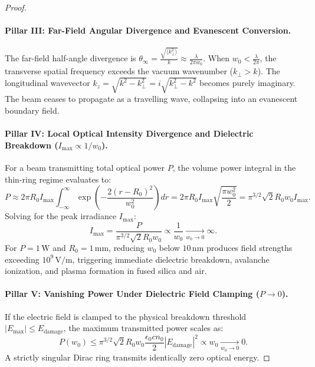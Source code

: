 \documentclass[11pt,a4paper]{article}
\begin{document}
\begin{proof}
\paragraph{Pillar III: Far-Field Angular Divergence and Evanescent Conversion.}
The far-field half-angle divergence is $\theta_\infty = \frac{\sqrt{\langle k_\perp^2 \rangle}}{k} \approx \frac{\lambda}{2\pi w_0}$. When $w_0 < \frac{\lambda}{2\pi}$, the transverse spatial frequency exceeds the vacuum wavenumber ($k_\perp > k$). The longitudinal wavevector $k_z = \sqrt{k^2 - k_\perp^2} = i \sqrt{k_\perp^2 - k^2}$ becomes purely imaginary. The beam ceases to propagate as a travelling wave, collapsing into an evanescent boundary field.

\paragraph{Pillar IV: Local Optical Intensity Divergence and Dielectric Breakdown ($I_{\max} \propto 1/w_0$).}
For a beam transmitting total optical power $P$, the volume power integral in the thin-ring regime evaluates to:
\begin{equation}
P \approx 2\pi R_0 I_{\max} \int_{-\infty}^\infty \exp\left( - \frac{2(r - R_0)^2}{w_0^2} \right) dr = 2\pi R_0 I_{\max} \sqrt{\frac{\pi w_0^2}{2}} = \pi^{3/2} \sqrt{2} R_0 w_0 I_{\max}.
\label{eq:power_volume_integral}
\end{equation}
Solving for the peak irradiance $I_{\max}$:
\begin{equation}
\boxed{I_{\max} = \frac{P}{\pi^{3/2} \sqrt{2} R_0 w_0} \propto \frac{1}{w_0} \xrightarrow[w_0 \to 0]{} \infty.}
\label{eq:pillar4_result}
\end{equation}
For $P = 1\,\text{W}$ and $R_0 = 1\,\text{mm}$, reducing $w_0$ below $10\,\text{nm}$ produces field strengths exceeding $10^9\,\text{V/m}$, triggering immediate dielectric breakdown, avalanche ionization, and plasma formation in fused silica and air.

\paragraph{Pillar V: Vanishing Power Under Dielectric Field Clamping ($P \to 0$).}
If the electric field is clamped to the physical breakdown threshold $|E_{\max}| \le E_{\text{damage}}$, the maximum transmitted power scales as:
\begin{equation}
\boxed{P(w_0) \le \pi^{3/2} \sqrt{2} R_0 w_0 \frac{\epsilon_0 c n_0}{2} |E_{\text{damage}}|^2 \propto w_0 \xrightarrow[w_0 \to 0]{} 0.}
\label{eq:pillar5_result}
\end{equation}
A strictly singular Dirac ring transmits identically zero optical energy.


\end{proof}
\end{document}
